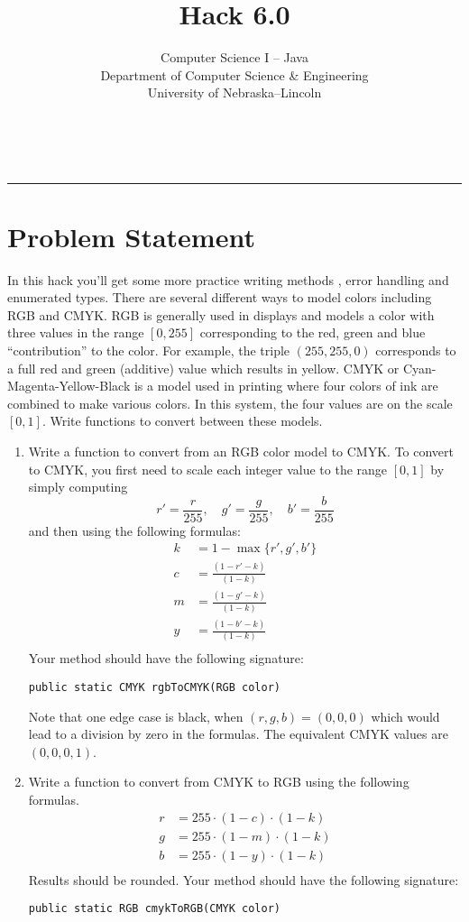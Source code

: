 \documentclass[12pt]{scrartcl}
\title{Hack 6.0}\let\Title\@title
\subtitle{Computer Science I -- Java\\
{\small
\vskip1cm
Department of Computer Science \& Engineering \\
University of Nebraska--Lincoln}
\vskip-1cm}
\date{~}
\begin{document}
\maketitle

\hrule



\section*{Problem Statement}

In this hack you'll get some more practice writing methods
, error handling and enumerated types.  There are several different
ways to model colors including RGB and CMYK.  RGB is generally used in displays
and models a color with three values in the range $[0, 255]$ corresponding to 
the red, green and blue ``contribution'' to the color.  For example, the
triple $(255, 255, 0)$ corresponds to a full red and green (additive) value
which results in yellow.  CMYK or Cyan-Magenta-Yellow-Black is a model used
in printing where four colors of ink are combined to make various colors.
In this system, the four values are on the scale $[0, 1]$.  Write 
functions to convert between these models.

\begin{enumerate}
\item Write a function to convert from an RGB color model to CMYK.  To 
convert to CMYK, you first need to scale each integer value to the range 
$[0, 1]$ by simply computing
	$$r' = \frac{r}{255}, \quad g' = \frac{g}{255}, \quad b' = \frac{b}{255}$$
	and then using the following formulas:
\begin{align*}
k & = 1-\max\{r', g', b'\} \\
c & = \frac{(1-r'-k)}{(1-k)} \\
m & = \frac{(1-g'-k)}{(1-k)} \\
y & = \frac{(1-b'-k)}{(1-k)} \\
\end{align*}
Your method should have the following signature:

\texttt{public static CMYK rgbToCMYK(RGB color)}

Note that one edge case is black, when $(r,g,b) = (0,0,0)$ which would lead to a 
division by zero in the formulas.  The equivalent CMYK values are $(0,0,0,1)$.


\item Write a function to convert from CMYK to RGB using the following formulas.
\begin{align*}
r & = 255 \cdot (1 - c) \cdot (1-k) \\
g & = 255 \cdot (1 - m) \cdot (1-k) \\
b & = 255 \cdot (1 - y) \cdot (1-k) \\
\end{align*}
Results should be rounded.  Your method should have the following signature:

\texttt{public static RGB cmykToRGB(CMYK color)}

\end{enumerate}
\end{document}
